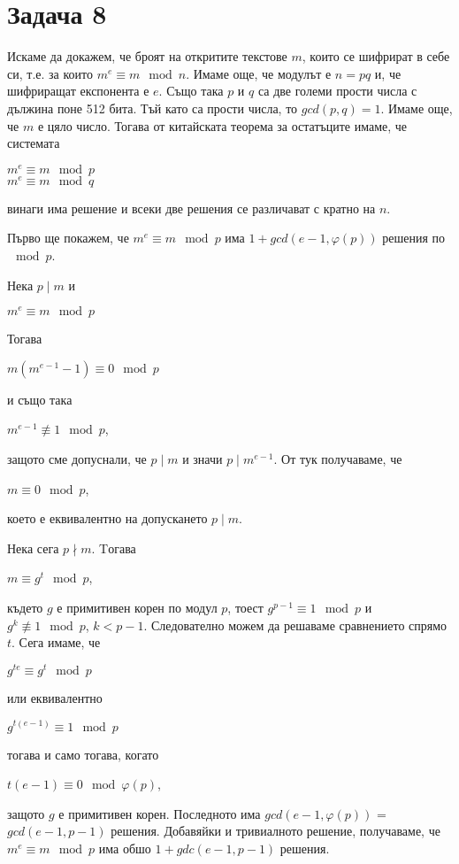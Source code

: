 \documentclass{article}
\begin{document}
\section*{Задача 8}

\justify
Искаме да докажем, че броят на откритите текстове $m$, които се шифрират в себе си, т.е. за които $m^e \equiv m \mod n$. Имаме още, че модулът е $n = pq$ и, че шифриращат експонента е $e$. Също така $p$ и $q$ са две големи прости числа с дължина поне 512 бита. Тъй като са прости числа, то $gcd(p,q) = 1$. Имаме още, че $m$ е цяло число. Тогава от китайската теорема за остатъците имаме, че системата 

\begin{center}
    $m^e \equiv m \mod p$ \\
    $m^e \equiv m \mod q$
\end{center}

\justify
винаги има решение и всеки две решения се различават с кратно на $n$.


\justify
Първо ще покажем, че $m^e \equiv m \mod p$ има $1 + gcd(e-1,\varphi(p))$ решения по $\mod p$.

\justify
Нека $p \mid m$ и
\begin{center}
    $m^e \equiv m \mod p$
\end{center}
\justify
Тогава 
\begin{center}
    $m(m^{e-1}-1) \equiv 0 \mod p$
\end{center} 
\justify
и също така 
\begin{center}
    $m^{e-1} \not\equiv 1 \mod p$,
\end{center}
\justify
защото сме допуснали, че $p \mid m$ и значи $p \mid m^{e-1}$. От тук получаваме, че 
\begin{center}
    $m \equiv 0 \mod p$,
\end{center}
\justify
което е еквивалентно на допускането $p \mid m$.

\justify
Нека сега $p \nmid m$. Tогава 
\begin{center}
    $m \equiv g^t \mod p$,
\end{center}
\justify
където $g$ е примитивен корен по модул $p$, тоест $g^{p-1} \equiv 1 \mod p$ и $g^k \not\equiv 1 \mod p$, $k < p-1$. Следователно можем да решаваме сравнението спрямо $t$. Сега имаме, че 
\begin{center}
    $g^{te} \equiv g^t \mod p$
\end{center}
\justify
или еквивалентно
\begin{center}
    $g^{t(e-1)} \equiv 1 \mod p$
\end{center}
\justify
тогава и само тогава, когато 
\begin{center}
    $t(e-1) \equiv 0 \mod \varphi(p)$,
\end{center}
\justify
защото $g$ е примитивен корен. Последното има $gcd(e-1,\varphi(p))$ = $gcd(e-1,p-1)$ решения. Добавяйки и тривиалното решение, получаваме, че $m^e \equiv m \mod p$ има обшо $1 + gdc(e-1,p-1)$ решения.
\end{document}
